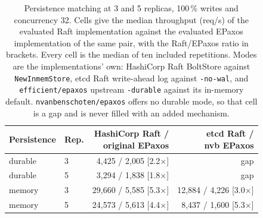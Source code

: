 \begin{table}[t]
\caption{Persistence matching at 3 and 5 replicas, 100\,\% writes and
concurrency 32. Cells give the median throughput (req/s) of the evaluated
Raft implementation against the evaluated EPaxos implementation of the same
pair, with the Raft/EPaxos ratio in brackets. Every cell is the median of ten
included repetitions. Modes are the implementations' own: HashiCorp Raft
BoltStore against \texttt{NewInmemStore}, etcd Raft write-ahead log against
\texttt{-no-wal}, and \texttt{efficient/epaxos} upstream \texttt{-durable}
against its in-memory default. \texttt{nvanbenschoten/epaxos} offers no durable
mode, so that cell is a gap and is never filled with an added mechanism.}
\label{tab:persistence}
\footnotesize
\setlength{\tabcolsep}{4pt}
\begin{tabular}{@{}llrr@{}}
\toprule
Persistence & Rep. & \shortstack[r]{HashiCorp Raft /\\original EPaxos} &
\shortstack[r]{etcd Raft /\\nvb EPaxos} \\
\midrule
durable & 3 & 4{,}425 / 2{,}005 [2.2$\times$] & gap \\
durable & 5 & 3{,}294 / 1{,}838 [1.8$\times$] & gap \\
memory  & 3 & 29{,}660 / 5{,}585 [5.3$\times$] & 12{,}884 / 4{,}226 [3.0$\times$] \\
memory  & 5 & 24{,}573 / 5{,}613 [4.4$\times$] & 8{,}437 / 1{,}600 [5.3$\times$] \\
\bottomrule
\end{tabular}
\end{table}

